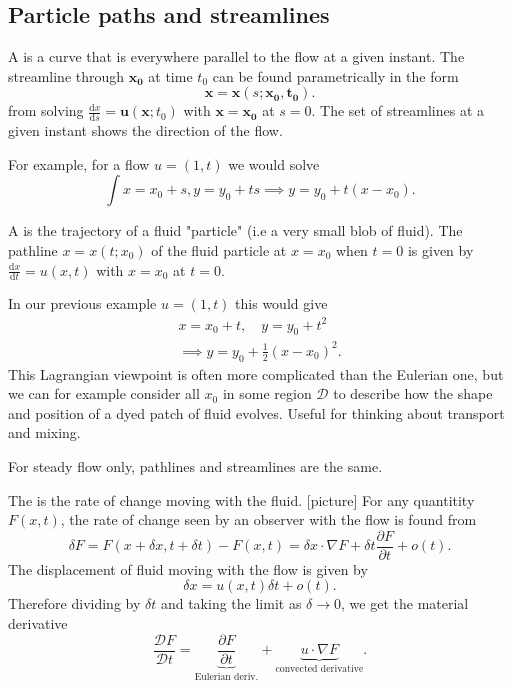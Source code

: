 \documentclass[a4paper]{scrartcl}
\begin{document}
\subsection{Particle paths and streamlines}
\begin{definition*}[Streamline]
     A  is a curve that is everywhere parallel to the flow at a given instant. The streamline through $\bm{x_0 } $ at time $t_0 $ can be found parametrically in the form \[
     \bm{x} =\bm{x} (s; \bm{x_0 } , \bm{t_0 } )
     .\] from solving $\frac{\mathrm{d}x}{\mathrm{d}s}=\bm{u} (\bm{x};t_0 )$ with $\bm{x} =\bm{x_0 } $ at $s=0$. The set of streamlines at a given instant shows the direction of the flow.
\end{definition*}
For example, for a flow $u= (1,t)$ we would solve \[
\int x = x_0 +s, y=y_0 +ts \implies y=y_0 +t (x-x_0 )
.\] 
\begin{definition*}
     A  is the trajectory of a fluid "particle" (i.e a very small blob of fluid). The pathline $x=x (t;x_0 )$ of the fluid particle at $x=x_0 $ when $t=0$ is given by $\frac{\mathrm{d}x}{\mathrm{d}t}=u (x,t)$ with $x=x_0 $ at $t=0$.
\end{definition*}
In our previous example $u= (1,t)$ this would give 
\begin{align*}
    x=x_0 +t, \quad y=y_0 +t^2 \\
    \implies y=y_0 + \frac{1}{2} (x-x_0)^2.
\end{align*}
This Lagrangian viewpoint is often more complicated than the Eulerian one, but we can for example consider all $x_0 $ in some region $\mathcal{D}$ to describe how the shape and position of a dyed patch of fluid evolves. Useful for thinking about transport and mixing.
\begin{remark}
     For steady flow only, pathlines and streamlines are the same. 
\end{remark}
\begin{definition*}
     The  is the rate of change moving with the fluid. [picture] For any quantitity $F (x,t)$, the rate of change seen by an observer with the flow is found from \[
     \delta F =F (x+\delta x, t+\delta t)-F (x,t)=\delta x \cdot \nabla F +\delta t \frac{\partial F}{\partial t}+o (t)
     .\] 
     The displacement of fluid moving with the flow is given by \[
     \delta x= u (x,t) \delta t + o (t)
     .\] Therefore dividing by $\delta t$ and taking the limit as $\delta \rightarrow 0$, we get the material derivative \[
     \frac{\mathcal{D}F}{\mathcal{D}t}=\underbrace{\frac{\partial F}{\partial t}}_{\text{Eulerian deriv.} } + \underbrace{u \cdot \nabla F}_{\text{convected derivative} } 
     .\] 
\end{definition*}
\end{document}
